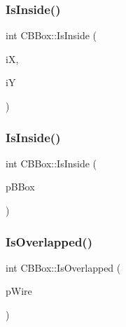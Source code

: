 \mbox{\label{classCBBox_a06176ef2a9c66bd680fe01ec001a7830}} 
\subsubsection{\texorpdfstring{IsInside()}{IsInside()}\hspace{0.1cm}{\footnotesize\ttfamily [3/4]}}
{\footnotesize\ttfamily int C\+B\+Box\+::\+Is\+Inside (\begin{DoxyParamCaption}\item[{int}]{iX,  }\item[{int}]{iY }\end{DoxyParamCaption})}

\mbox{\label{classCBBox_ad00a75c0330ee8138ea4a46b45eb1acb}} 
\subsubsection{\texorpdfstring{IsInside()}{IsInside()}\hspace{0.1cm}{\footnotesize\ttfamily [4/4]}}
{\footnotesize\ttfamily int C\+B\+Box\+::\+Is\+Inside (\begin{DoxyParamCaption}\item[{\mbox{\hyperlink{classCBBox}{C\+B\+Box}} $\ast$}]{p\+B\+Box }\end{DoxyParamCaption})}

\mbox{\label{classCBBox_ae38173ceac641fb233a941299764f519}} 
\subsubsection{\texorpdfstring{IsOverlapped()}{IsOverlapped()}\hspace{0.1cm}{\footnotesize\ttfamily [1/2]}}
{\footnotesize\ttfamily int C\+B\+Box\+::\+Is\+Overlapped (\begin{DoxyParamCaption}\item[{\mbox{\hyperlink{classCWire}{C\+Wire}} $\ast$}]{p\+Wire }\end{DoxyParamCaption})}

\mbox{\label{classCBBox_afbd0200a17c5610ec613482020213970}} 
